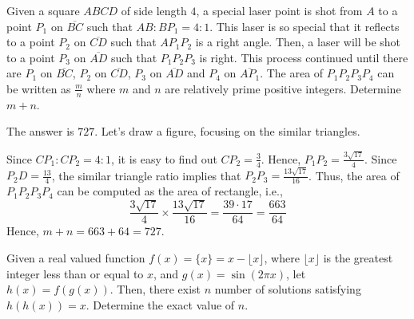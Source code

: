 \begin{problem}
Given a square $ABCD$ of side length $4$, a special laser point is shot from $A$ to a point $P_1$ on $\overline{BC}$ such that $AB:BP_1=4:1$. This laser is so special that it reflects to a point $P_2$ on $\overline{CD}$ such that $AP_1P_2$ is a right angle. Then, a laser will be shot to a point $P_3$ on $\overline{AD}$ such that $P_1P_2P_3$ is right. This process continued until there are $P_1$ on $\overline{BC}$, $P_2$ on $\overline{CD}$, $P_3$ on $\overline{AD}$ and $P_4$ on $\overline{AP_1}$. The area of $P_1P_2P_3P_4$ can be written as $\frac{m}{n}$ where $m$ and $n$ are relatively prime positive integers. Determine $m+n$.
\end{problem}

\begin{solution}
The answer is $727$. Let's draw a figure, focusing on the similar triangles. 
\begin{center}
\end{center}
Since $CP_1:CP_2=4:1$, it is easy to find out $CP_2=\frac34$. Hence, $P_1P_2=\frac{3\sqrt{17}}{4}$. Since $P_2D=\frac{13}{4}$, the similar triangle ratio implies that $P_2P_3=\frac{13\sqrt{17}}{16}$. Thus, the area of $P_1P_2P_3P_4$ can be computed as the area of rectangle, i.e., 
\[
\frac{3\sqrt{17}}{4}\times\frac{13\sqrt{17}}{16}=\frac{39\cdot17}{64}=\frac{663}{64}
\]
Hence, $m+n=663+64=727$.
\end{solution}

\begin{problem}
Given a real valued function $f(x)=\{x\}=x-\lfloor x \rfloor$, where $\lfloor x \rfloor$ is the greatest integer less than or equal to $x$, and $g(x)=\sin(2\pi x)$, let $h(x)=f(g(x))$. Then, there exist $n$ number of solutions satisfying $h(h(x))=x$. Determine the exact value of $n$.
\end{problem}

